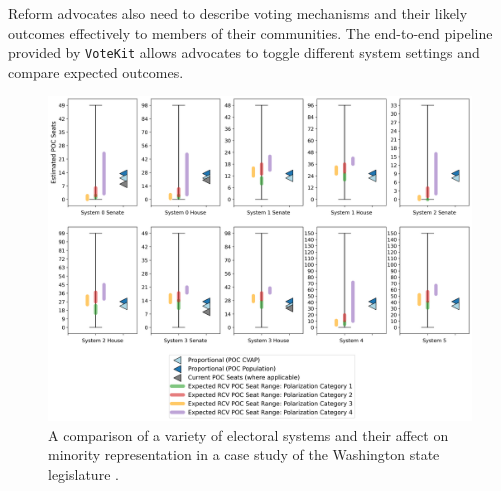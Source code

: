 \documentclass{article}
\newcommand{\VK}{{\tt VoteKit}\xspace}
\begin{document}
Reform advocates also need to describe voting mechanisms and their
likely outcomes effectively to members of their communities. The end-to-end pipeline provided by \VK allows advocates to toggle different system settings and compare expected outcomes.
\begin{figure}[bht!]
    \includegraphics[options]{./figures/WA_poc_seats_chartsystem_compare_pared.png}
    \caption{A comparison of a variety of electoral systems and their affect on minority representation in a case study of the Washington state legislature \cite{washington_leg}.}
    \label{fig:comparison}
\end{figure}






\end{document}

